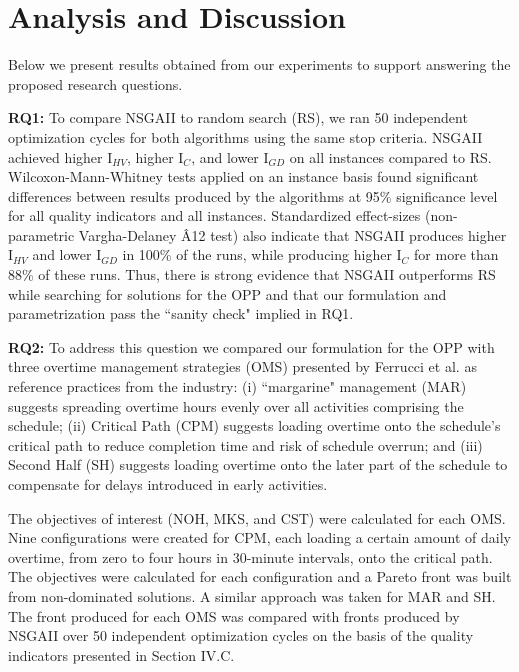 \documentclass[conference]{IEEEtran}
\begin{document}
\section{Analysis and Discussion}
Below we present results obtained from our experiments to support answering the proposed research questions.

\vspace{3px}
\noindent
\textbf{RQ1:} To compare NSGAII to random search (RS), we ran 50 independent optimization cycles for both algorithms using the same stop criteria. NSGAII achieved higher I$_{HV}$, higher I$_{C}$, and lower I$_{GD}$ on all instances compared to RS. Wilcoxon-Mann-Whitney tests applied on an instance basis found significant differences between results produced by the algorithms at 95\% significance level for all quality indicators and all instances. Standardized effect-sizes (non-parametric Vargha-Delaney {\^A}12 test) also indicate that NSGAII produces higher I$_{HV}$ and lower I$_{GD}$ in 100\% of the runs, while producing higher I$_{C}$ for more than 88\% of these runs. Thus, there is strong evidence that NSGAII outperforms RS while searching for solutions for the OPP and that our formulation and parametrization pass the ``sanity check" implied in RQ1.

\vspace{3px}
\noindent
\textbf{RQ2:} To address this question we compared our formulation for the OPP with three overtime management strategies (OMS) presented by Ferrucci et al. \cite{Ferrucci:2013} as reference practices from the industry: (i) ``margarine" management (MAR) suggests spreading overtime hours evenly over all activities comprising the schedule; (ii) Critical Path (CPM) suggests loading overtime onto the schedule's critical path to reduce completion time and risk of schedule overrun; and (iii) Second Half (SH) suggests loading overtime onto the later part of the schedule to compensate for delays introduced in early activities. 

The objectives of interest (NOH, MKS, and CST) were calculated for each OMS. Nine configurations were created for CPM, each loading a certain amount of daily overtime, from zero to four hours in 30-minute intervals, onto the critical path. The objectives were calculated for each configuration and a Pareto front was built from non-dominated solutions. A similar approach was taken for MAR and SH. The front produced for each OMS was compared with fronts produced by NSGAII over 50 independent optimization cycles on the basis of the quality indicators presented in Section IV.C.
\end{document}
